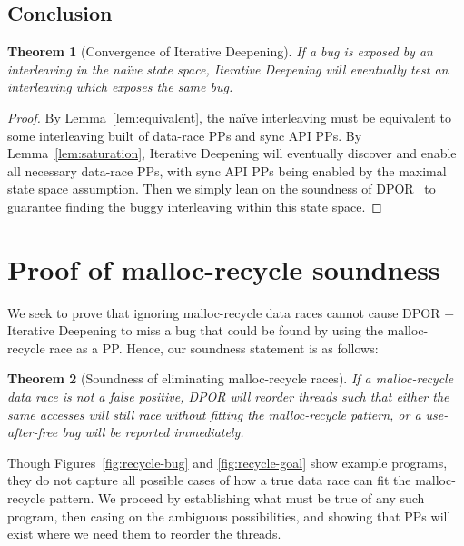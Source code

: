 \documentclass[pldi]{sigplanconf-pldi15}
\newtheorem{theorem}{Theorem}
\begin{document}
\subsection{Conclusion}

\setcounter{theorem}{1}
\begin{theorem}[Convergence of Iterative Deepening]
	If a bug is exposed by an interleaving in the na\"{i}ve state space, Iterative Deepening will eventually test an interleaving which exposes the same bug.
\end{theorem}

\begin{proof}
By Lemma~\ref{lem:equivalent}, the na\"{i}ve interleaving must be equivalent to some interleaving built of data-race PPs and sync API PPs.
By Lemma~\ref{lem:saturation}, Iterative Deepening will eventually discover and enable all necessary data-race PPs, with sync API PPs being enabled by the maximal state space assumption.
Then we simply lean on the soundness of DPOR~\cite{dpor} to guarantee finding the buggy interleaving within this state space.
\end{proof}


\section{Proof of malloc-recycle soundness}
\label{sec:proof}

We seek to prove that ignoring malloc-recycle data races cannot cause DPOR + Iterative Deepening to miss a bug that could be found by using the malloc-recycle race as a PP. Hence, our soundness statement is as follows:

\begin{theorem}[Soundness of eliminating malloc-recycle races]
	If a malloc-recycle data race is not a false positive, DPOR will reorder threads such that either the same accesses will still race without fitting the malloc-recycle pattern, or a use-after-free bug will be reported immediately.
\end{theorem}

Though Figures~\ref{fig:recycle-bug} and \ref{fig:recycle-goal} show example programs, they do not capture all possible cases of how a true data race can fit the malloc-recycle pattern.
We proceed by establishing what must be true of any such program, then casing on the ambiguous possibilities, and showing that PPs will exist where we need them to reorder the threads.
\end{document}

